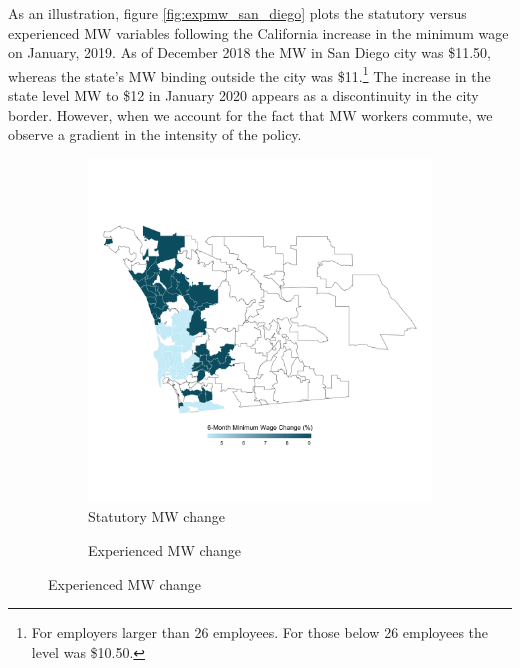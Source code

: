 
As an illustration, figure \ref{fig:expmw_san_diego} plots the statutory versus experienced 
MW variables following the California increase in the minimum wage on January, 2019. As of 
December 2018 the MW in San Diego city was \$11.50, whereas the state's MW binding outside 
the city was \$11.\footnote{For employers larger than 26 employees. For those below 26 
	employees the level was \$10.50.}
The increase in the state level MW to \$12 in January 2020 appears as a discontinuity in the 
city border. However, when we account for the fact that MW workers commute, we observe a 
gradient in the intensity of the policy.


\begin{figure}
	\caption{The California MW increase of January 2019 in San Diego}
	\label{fig:expmw_san_diego}
	\centering
	\begin{subfigure}[b]{0.55\textwidth}
		\caption{Statutory MW change}
		\includegraphics[width = \textwidth]
			{../../analysis/descriptive_maps/output/San_Diego_mw_msa.png}
	\end{subfigure}
	\begin{subfigure}[b]{0.55\textwidth}
		\caption{Experienced MW change}

\end{subfigure}
\end{figure}
